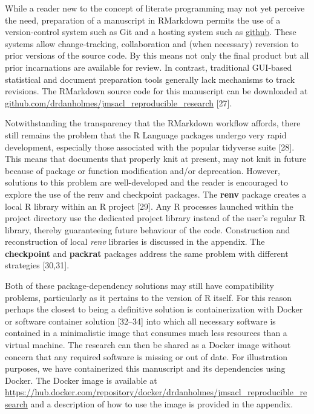 \documentclass[]{elsarticle} %
\begin{document}
While a reader new to the concept of literate programming may not yet
perceive the need, preparation of a manuscript in RMarkdown permits the
use of a version-control system such as Git and a hosting system such as
\href{https://github.com/}{github}. These systems allow change-tracking,
collaboration and (when necessary) reversion to prior versions of the
source code. By this means not only the final product but all prior
incarnations are available for review. In contrast, traditional
GUI-based statistical and document preparation tools generally lack
mechanisms to track revisions. The RMarkdown source code for this
manuscript can be downloaded at
\href{https://github.com/drdanholmes/jmsacl_reproducible_research}{github.com/drdanholmes/jmsacl\_reproducible\_research}
{[}27{]}.

Notwithstanding the transparency that the RMarkdown workflow affords,
there still remains the problem that the R Language packages undergo
very rapid development, especially those associated with the popular
tidyverse suite {[}28{]}. This means that documents that properly knit
at present, may not knit in future because of package or function
modification and/or deprecation. However, solutions to this problem are
well-developed and the reader is encouraged to explore the use of the
renv and checkpoint packages. The \textbf{renv} package creates a local
R library within an R project {[}29{]}. Any R processes launched within
the project directory use the dedicated project library instead of the
user's regular R library, thereby guaranteeing future behaviour of the
code. Construction and reconstruction of local \emph{renv} libraries is
discussed in the appendix. The \textbf{checkpoint} and \textbf{packrat}
packages address the same problem with different strategies {[}30,31{]}.

Both of these package-dependency solutions may still have compatibility
problems, particularly as it pertains to the version of R itself. For
this reason perhaps the closest to being a definitive solution is
containerization with Docker or software container solution {[}32--34{]}
into which all necessary software is contained in a minimalistic image
that consumes much less resources than a virtual machine. The research
can then be shared as a Docker image without concern that any required
software is missing or out of date. For illustration purposes, we have
containerized this manuscript and its dependencies using Docker. The
Docker image is available at
\url{https://hub.docker.com/repository/docker/drdanholmes/jmsacl_reproducible_research}
and a description of how to use the image is provided in the appendix.
\end{document}
